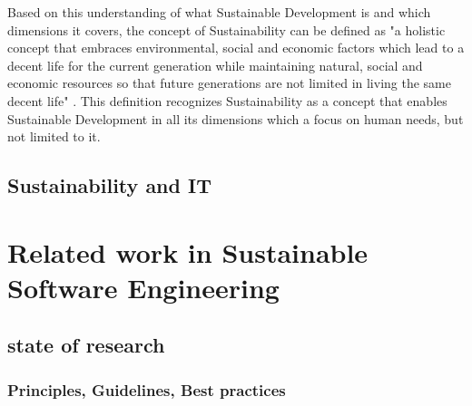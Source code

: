 Based on this understanding of what Sustainable Development is and which dimensions it covers, the concept of Sustainability can be defined as "a holistic concept that embraces environmental, social and economic factors which lead to a decent life for the current generation while maintaining natural, social and economic resources so that future generations are not limited in living the same decent life" \cite{buchner_sust_16}.%
 This definition recognizes Sustainability as a concept that enables Sustainable Development in all its dimensions which a focus on human needs, but not limited to it.



\section{Sustainability and IT}  %



\chapter{Related work in Sustainable Software Engineering}
\section{state of research}



\subsection{Principles, Guidelines, Best practices}


